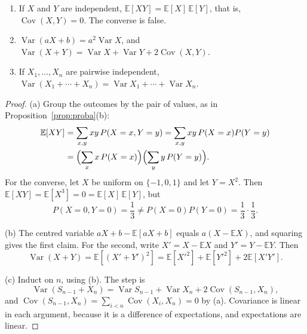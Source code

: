\begin{proposition}\label{prop:varsum}
\begin{enumerate}[label=(\alph*)]
\item If $X$ and $Y$ are independent, $\mathbb E[XY]=\mathbb E[X]\,\mathbb E[Y]$, that is, $\operatorname{Cov}(X,Y)=0$. The converse is false.
\item $\operatorname{Var}(aX+b)=a^2\operatorname{Var}X$, and $\operatorname{Var}(X+Y)=\operatorname{Var}X+\operatorname{Var}Y+2\operatorname{Cov}(X,Y)$.
\item If $X_1,\ldots,X_n$ are pairwise independent, $\operatorname{Var}(X_1+\cdots+X_n)=\operatorname{Var}X_1+\cdots+\operatorname{Var}X_n$.
\end{enumerate}
\end{proposition}
\begin{proof}
(a) Group the outcomes by the pair of values, as in Proposition~\ref{prop:proba}(b):
\[
\begin{aligned}
\mathbb E[XY]
&=\sum_{x,y}xy\,P(X=x,Y=y)
=\sum_{x,y}xy\,P(X=x)P(Y=y)\\
&=\Bigl(\sum_x x\,P(X=x)\Bigr)\Bigl(\sum_y y\,P(Y=y)\Bigr).
\end{aligned}
\]
For the converse, let $X$ be uniform on $\{-1,0,1\}$ and let $Y=X^2$. Then $\mathbb E[XY]=\mathbb E[X^3]=0=\mathbb E[X]\,\mathbb E[Y]$, but
\[
 P(X=0,Y=0)=\frac13\ne P(X=0)P(Y=0)=\frac13\cdot\frac13.
\]

(b) The centred variable $aX+b-\mathbb E[aX+b]$ equals $a(X-\mathbb EX)$, and squaring gives the first claim. For the second, write $X'=X-\mathbb EX$ and $Y'=Y-\mathbb EY$. Then
\[
 \operatorname{Var}(X+Y)=\mathbb E[(X'+Y')^2]=\mathbb E[X'^2]+\mathbb E[Y'^2]+2\mathbb E[X'Y'].
\]

(c) Induct on $n$, using (b). The step is
\[
 \operatorname{Var}(S_{n-1}+X_n)=\operatorname{Var}S_{n-1}+\operatorname{Var}X_n+2\operatorname{Cov}(S_{n-1},X_n),
\]
and $\operatorname{Cov}(S_{n-1},X_n)=\sum_{i<n}\operatorname{Cov}(X_i,X_n)=0$ by (a). Covariance is linear in each argument, because it is a difference of expectations, and expectations are linear.
\end{proof}

